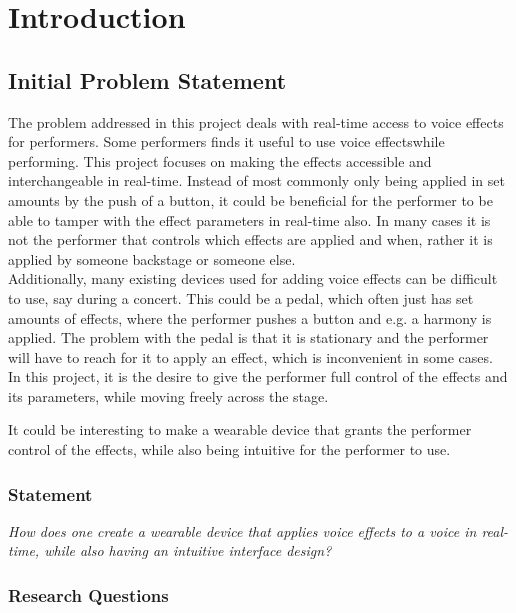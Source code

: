\chapter{Introduction}\label{ch:Intro}

\section{Initial Problem Statement}

The problem addressed in this project deals with real-time access to voice effects for performers. 
Some performers finds it useful to use voice effectswhile performing. This project focuses on making the effects accessible and interchangeable in real-time. Instead of most commonly only being applied in set amounts by the push of a button, it could be beneficial for the performer to be able to tamper with the effect parameters in real-time also. In many cases it is not the performer that controls which effects are applied and when, rather it is applied by someone backstage or someone else. \\

Additionally, many existing devices used for adding voice effects can be difficult to use, say during a concert. This could be a pedal, which often just has set amounts of effects, where the performer pushes a button and e.g. a harmony is applied. The problem with the pedal is that it is stationary and the performer will have to reach for it to apply an effect, which is inconvenient in some cases.\\

In this project, it is the desire to give the performer full control of the effects and its parameters, while moving freely across the stage.

It could be interesting to make a wearable device that grants the performer control of the effects, while also being intuitive for the performer to use.


\subsection{Statement}

\textit{How does one create a wearable device that applies voice effects to a voice in real-time, while also having an intuitive interface design?}


\subsection{Research Questions}\label{sub:ResearchQ}

